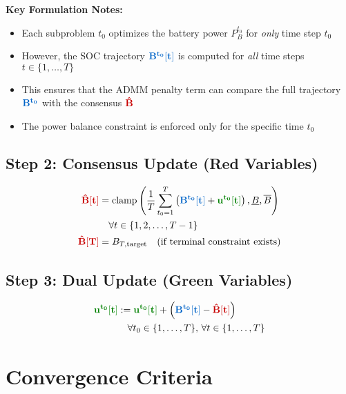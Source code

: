 \documentclass[11pt]{article}
\newcommand{\blueB}[1]{\textcolor{bluevar}{\mathbf{#1}}}      %
\newcommand{\redBhat}[1]{\textcolor{redvar}{\mathbf{#1}}}     %
\newcommand{\greenu}[1]{\textcolor{greenvar}{\mathbf{#1}}}    %
\begin{document}

\textbf{Key Formulation Notes:}
\begin{itemize}
    \item Each subproblem $t_0$ optimizes the battery power $P_{B}^{t_0}$ for \textit{only} time step $t_0$
    \item However, the SOC trajectory $\blueB{B^{t_0}[t]}$ is computed for \textit{all} time steps $t \in \{1, \ldots, T\}$
    \item This ensures that the ADMM penalty term can compare the full trajectory $\blueB{B^{t_0}}$ with the consensus $\redBhat{\hat{B}}$
    \item The power balance constraint is enforced only for the specific time $t_0$
\end{itemize}

\subsection{Step 2: Consensus Update (Red Variables)}
\begin{align}
\redBhat{\hat{B}[t]} &= \text{clamp}\left( \frac{1}{T} \sum_{t_0=1}^{T} \left( \blueB{B^{t_0}[t]} + \greenu{u^{t_0}[t]} \right), \underline{B}, \overline{B} \right) \\
&\quad \forall t \in \{1, 2, \ldots, T-1\} \\
\redBhat{\hat{B}[T]} &= B_{T,\text{target}} \quad \text{(if terminal constraint exists)}
\end{align}

\subsection{Step 3: Dual Update (Green Variables)}
\begin{align}
\greenu{u^{t_0}[t]} &:= \greenu{u^{t_0}[t]} + \left( \blueB{B^{t_0}[t]} - \redBhat{\hat{B}[t]} \right) \\
&\quad \forall t_0 \in \{1, \ldots, T\}, \, \forall t \in \{1, \ldots, T\}
\end{align}

\section{Convergence Criteria}
\end{document}
